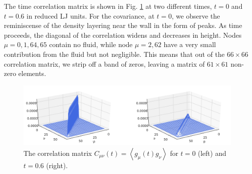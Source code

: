 \documentclass[b5paper,openright,11pt]{book}
\newcommand{\llangle}{\left\langle}
\newcommand{\rrangle}{\right\rangle}
\begin{document}
The time correlation  matrix is shown in  Fig.  \ref{fig:Ct-matrix-WALLS-66nodes} at
two different  times, $t=0$ and  $t=0.6$ in  reduced LJ units.   For the
covariance,  at $t=0$,  we  observe the  reminiscense  of the  density
layering near  the wall in the  form of peaks.  As  time proceeds, the
diagonal of  the correlation  widens and  decreases in  height.  Nodes
$\mu=0,1,64,65$ contain  no fluid, while  node $\mu=2,62$ have  a very
small  contribution  from  the  fluid but not negligible.  This means  that  out  of  the
$66\times66$ correlation matrix, we strip off a band of zeros, leaving
a matrix of $61\times61$ non-zero elements.

\begin{figure}[h!]
\centering
\includegraphics[width=\linewidth]{Ct-matrix-WALLS-66nodes}
\caption[Correlation matrix $C(t)$ at $t=0$ and $t=0.6$ for confined fluid - 66 nodes.]{The   correlation    matrix   $C_{\mu\nu}(t)=\llangle
g_{\mu}(t)  g_\nu\rrangle$ for  $t=0$ (left) and $t=0.6$ (right).}
\label{fig:Ct-matrix-WALLS-66nodes}
\end{figure}
\end{document}
